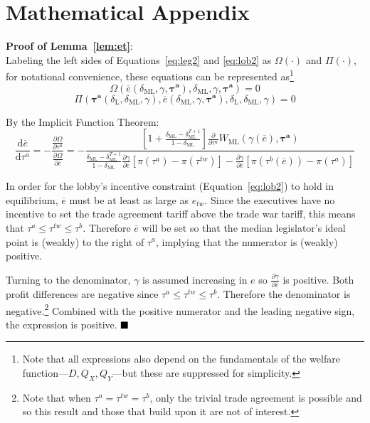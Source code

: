 \documentclass[authoryear, review]{elsarticle}
\newcommand{\ov}{\overline}
\newcommand{\bta}{\bm{\tau^a}}
\newcommand{\ga}{\gamma}
\newcommand{\de}{\delta}
\begin{document}
\section{Mathematical Appendix}
\noindent \textbf{\hypertarget{Cor_et}{Proof of Lemma~\ref{lem:et}}}: \\
Labeling the left sides of Equations~\ref{eq:leg2} and \ref{eq:lob2} as $\Omega\left(\cdot\right)$ and $\Pi\left(\cdot\right)$, for notational convenience, these equations can be represented as\footnote{Note that all expressions also depend on the fundamentals of the welfare function---$D,Q_X,Q_Y$---but these are suppressed for simplicity.}
\begin{equation}
  \Omega\left(\ov{e}\left(\de_\text{ML},\ga,\bta \right),\de_\text{ML},\ga,\bta \right) = 0
	\label{eq:leg3}
\end{equation}
\begin{equation}
  \Pi\left(\bta\left(\de_\text{L},\de_\text{ML},\ga\right),\ov{e}\left(\de_\text{ML},\ga,\bta\right),\de_\text{L},\de_\text{ML},\ga \right) = 0
  \label{eq:lob3}
\end{equation}


By the Implicit Function Theorem:
\begin{equation}
 	\frac{\mathrm{d} \ov{e}}{\mathrm{d} \tau^a} = -\frac{\frac{\partial \Omega}{\partial \tau^a}}{\frac{\partial \Omega}{\partial \ov{e}}} = -
	\textstyle \frac{\left[1+ \frac{\de_\text{ML} - \de_\text{ML}^{T+1}}{1-\de_\text{ML}}  \right]\frac{\partial}{\partial \tau^a}W_\text{ML}(\ga(\ov{e}),\bta)} {\frac{\de_\text{ML} - \de_\text{ML}^{T+1}}{1-\de_\text{ML}}\frac{\partial \ga}{\partial \ov{e}}\left[ \pi(\tau^a) - \pi(\tau^{tw}) \right] - \frac{\partial \ga}{\partial \ov{e}}\left[ \pi(\tau^b(\ov{e})) - \pi(\tau^{a}) \right]}
	\label{eq:coret}
\end{equation}

\noindent In order for the lobby's incentive constraint (Equation~\ref{eq:lob2}) to hold in equilibrium, $\ov{e}$ must be at least as large as $e_{tw}$. Since the executives have no incentive to set the trade agreement tariff above the trade war tariff, this means that $\tau^a \leq \tau^{tw} \leq \tau^b$. Therefore $\ov{e}$ will be set so that the median legislator's ideal point is (weakly) to the right of $\tau^a$, implying that the numerator is (weakly) positive.

Turning to the denominator, $\ga$ is assumed increasing in $e$ so $\frac{\partial \ga}{\partial \ov{e}}$ is positive. Both profit differences are negative since $\tau^a \leq \tau^{tw} \leq \tau^b$. Therefore the denominator is negative.\footnote{Note that when $\tau^a = \tau^{tw} = \tau^b$, only the trivial trade agreement is possible and so this result and those that build upon it are not of interest.} Combined with the positive numerator and the leading negative sign, the expression is positive. $\hfill\blacksquare$
\end{document}
